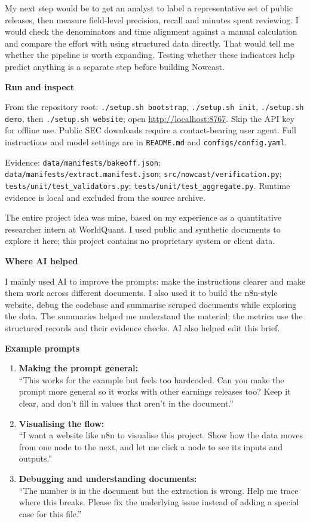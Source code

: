 \documentclass[10pt,a4paper]{article}
\newcommand{\topic}[1]{\par\vspace{5pt}{\large\bfseries\color{teal}#1}\par\vspace{1pt}}
\newcommand{\smalltopic}[1]{\par\vspace{3pt}\textbf{#1}\par}
\newcommand{\code}[1]{{\footnotesize\nolinkurl{#1}}}
\newcommand{\captionline}[1]{{\footnotesize\color{ink!75}#1}\par}
\begin{document}
My next step would be to get an analyst to label a representative set of public
releases, then measure field-level precision, recall and minutes spent reviewing.
I would check the denominators and time alignment against a manual calculation and
compare the effort with using structured data directly. That would tell me whether
the pipeline is worth expanding. Testing whether these indicators help predict
anything is a separate step before building Nowcast.

\smalltopic{Run and inspect}
From the repository root: \texttt{./setup.sh bootstrap}, \texttt{./setup.sh init},
\texttt{./setup.sh demo}, then \texttt{./setup.sh website}; open
\url{http://localhost:8767}. Skip the API key for offline use. Public SEC downloads
require a contact-bearing user agent. Full instructions and model settings are in
\code{README.md} and \code{configs/config.yaml}.

\captionline{Evidence: \code{data/manifests/bakeoff.json};
\code{data/manifests/extract.manifest.json}; \code{src/nowcast/verification.py};
\code{tests/unit/test_validators.py}; \code{tests/unit/test_aggregate.py}.
Runtime evidence is local and excluded from the source archive.}

\newpage
\topic{Appendix\enspace What was added beyond AI}
The entire project idea was mine, based on my experience as a quantitative researcher
intern at WorldQuant. I used public and synthetic documents to explore it here; this
project contains no proprietary system or client data.

\smalltopic{Where AI helped}
I mainly used AI to improve the prompts: make the instructions clearer and make them
work across different documents. I also used it to build the n8n-style website,
debug the codebase and summarise scraped documents while exploring the data. The
summaries helped me understand the material; the metrics use the structured records
and their evidence checks. AI also helped edit this brief.

\smalltopic{Example prompts}
\begin{enumerate}
\setlength{\itemsep}{6pt}
\item \textbf{Making the prompt general:}\\
``This works for the example but feels too hardcoded. Can you make the prompt more
general so it works with other earnings releases too? Keep it clear, and don't fill
in values that aren't in the document.''
\item \textbf{Visualising the flow:}\\
``I want a website like n8n to visualise this project. Show how the data moves from
one node to the next, and let me click a node to see its inputs and outputs.''
\item \textbf{Debugging and understanding documents:}\\
``The number is in the document but the extraction is wrong. Help me trace where
this breaks. Please fix the underlying issue instead of adding a special case for
this file.''
\end{enumerate}
\end{document}
